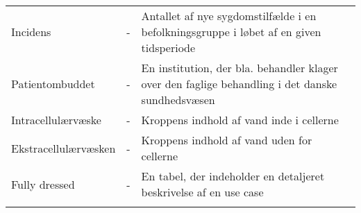 \begin{table}[H]
\begin{tabularx}{\linewidth}{l l X}
Incidens 			& - &  Antallet af nye sygdomstilfælde i en befolkningsgruppe i løbet af en given tidsperiode \\ \addlinespace[2mm]


Patientombuddet 			& - &  En institution, der bla. behandler klager over den faglige behandling i det danske sundhedsvæsen \\ \addlinespace[2mm]

Intracellulærvæske 			& - &   Kroppens indhold af vand inde i cellerne\\ \addlinespace[2mm]

Ekstracellulærvæsken & - &   Kroppens indhold af vand uden for cellerne\\ \addlinespace[2mm]

Fully dressed & - &   En tabel, der indeholder en detaljeret beskrivelse af en use case\\ \addlinespace[2mm]

\end{tabularx}
\end{table}


